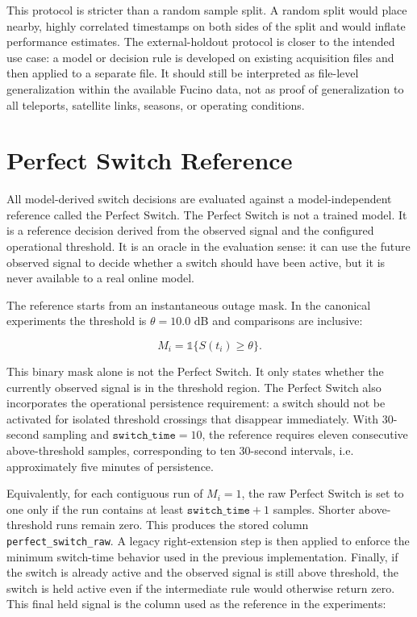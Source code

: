 This protocol is stricter than a random sample split. A random split would place
nearby, highly correlated timestamps on both sides of the split and would inflate
performance estimates. The external-holdout protocol is closer to the intended
use case: a model or decision rule is developed on existing acquisition files and
then applied to a separate file. It should still be interpreted as file-level
generalization within the available Fucino data, not as proof of generalization
to all teleports, satellite links, seasons, or operating conditions.

\section{Perfect Switch Reference}

All model-derived switch decisions are evaluated against a model-independent
reference called the Perfect Switch. The Perfect Switch is not a trained model.
It is a reference decision derived from the observed signal and the configured
operational threshold. It is an oracle in the evaluation sense: it can use the
future observed signal to decide whether a switch should have been active, but
it is never available to a real online model.

The reference starts from an instantaneous outage mask. In the canonical
experiments the threshold is \(\theta=10.0\) dB and comparisons are inclusive:

\[
  M_i = \mathbb{1}\{S(t_i) \geq \theta\}.
\]

This binary mask alone is not the Perfect Switch. It only states whether the
currently observed signal is in the threshold region. The Perfect Switch also
incorporates the operational persistence requirement: a switch should not be
activated for isolated threshold crossings that disappear immediately. With
30-second sampling and \(\texttt{switch\_time}=10\), the reference requires
eleven consecutive above-threshold samples, corresponding to ten 30-second
intervals, i.e. approximately five minutes of persistence.

Equivalently, for each contiguous run of \(M_i=1\), the raw Perfect Switch is set
to one only if the run contains at least
\(\texttt{switch\_time}+1\) samples. Shorter above-threshold runs remain zero.
This produces the stored column \texttt{perfect\_switch\_raw}. A legacy
right-extension step is then applied to enforce the minimum switch-time behavior
used in the previous implementation. Finally, if the switch is already active
and the observed signal is still above threshold, the switch is held active even
if the intermediate rule would otherwise return zero. This final held signal is
the column used as the reference in the experiments:

